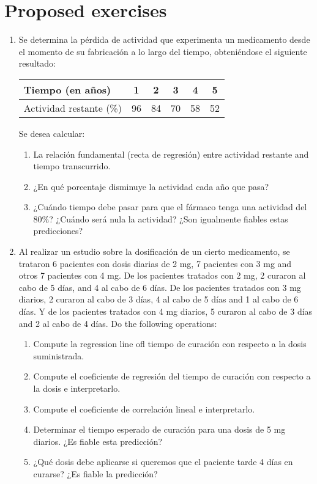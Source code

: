 \section{Proposed exercises}
\begin{enumerate}[leftmargin=*]
\item  Se determina la pérdida de actividad que experimenta un medicamento desde el momento de su fabricación a lo
largo del tiempo, obteniéndose el siguiente resultado:
\begin{center}
\begin{tabular}{|l|c|c|c|c|c|}
\hline 
Tiempo (en años) & 1 & 2 & 3 & 4 & 5 \\ 
\hline 
Actividad restante (\%) & 96 & 84 & 70 & 58 & 52 \\ 
\hline
\end{tabular}
\end{center}
Se desea calcular:
\begin{enumerate}
\item  La relación fundamental (recta de regresión) entre actividad restante and tiempo transcurrido.
\item ¿En qué porcentaje disminuye la actividad cada año que pasa?
\item ¿Cuándo tiempo debe pasar para que el fármaco tenga una actividad del 80\%? ¿Cuándo será nula la actividad?
¿Son igualmente fiables estas predicciones?
\end{enumerate}

\item Al realizar un estudio sobre la dosificación de un cierto medicamento, se trataron 6 pacientes con dosis diarias
de 2 mg, 7 pacientes con 3 mg and otros 7 pacientes con 4 mg. De los pacientes tratados con 2 mg, 2 curaron al cabo de 5
días, and 4 al cabo de 6 días. De los pacientes tratados con 3 mg diarios, 2 curaron al cabo de 3 días, 4 al cabo de 5
días and 1 al cabo de 6 días. Y de los pacientes tratados con 4 mg diarios, 5 curaron al cabo de 3 días and 2 al cabo de 4
días. Do the following operations: 
\begin{enumerate}
\item Compute la regression line ofl tiempo de curación con respecto a la dosis suministrada.
\item Compute el coeficiente de regresión del tiempo de curación con respecto a la dosis e interpretarlo.
\item Compute el coeficiente de correlación lineal e interpretarlo.
\item Determinar el tiempo esperado de curación para una dosis de 5 mg diarios. ¿Es fiable esta predicción?
\item ¿Qué dosis debe aplicarse si queremos que el paciente tarde 4 días en curarse? ¿Es fiable la predicción?
\end{enumerate}


\end{enumerate}
